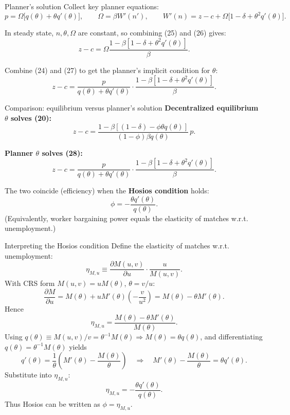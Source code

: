 \documentclass[aspectratio=169,xcolor=dvipsnames]{beamer}
\begin{document}
\begin{frame}{Planner's solution}
\label{slide:MP_47_PlannerSol}
\small
Collect key planner equations:
\[
p=\Omega\big[q(\theta)+\theta q'(\theta)\big],
\qquad
\Omega=\beta W'(n'),
\qquad
W'(n)=z-c+\Omega\big[1-\delta+\theta^2 q'(\theta)\big].
\]

In steady state, \(n,\theta,\Omega\) are constant, so combining (25) and (26) gives:
\[
z-c
=
\Omega\frac{1-\beta[1-\delta+\theta^2 q'(\theta)]}{\beta}.
\tag{27}
\]

Combine (24) and (27) to get the planner's implicit condition for \(\theta\):
\[
z-c
=
\frac{p}{q(\theta)+\theta q'(\theta)}\cdot
\frac{1-\beta[1-\delta+\theta^2 q'(\theta)]}{\beta}.
\tag{28}
\]
\end{frame}

\begin{frame}{Comparison: equilibrium versus planner's solution}
\label{slide:MP_48_Compare}
\small
\textbf{Decentralized equilibrium \(\theta\) solves (20):}
\[
z-c
=
\frac{1-\beta[(1-\delta)-\phi\theta q(\theta)]}{(1-\phi)\beta q(\theta)}\,p.
\tag{20}
\]

\textbf{Planner \(\theta\) solves (28):}
\[
z-c
=
\frac{p}{q(\theta)+\theta q'(\theta)}\cdot
\frac{1-\beta[1-\delta+\theta^2 q'(\theta)]}{\beta}.
\tag{28}
\]

The two coincide (efficiency) when the \textbf{Hosios condition} holds:
\[
\phi = -\frac{\theta q'(\theta)}{q(\theta)}.
\]
(Equivalently, worker bargaining power equals the elasticity of matches w.r.t. unemployment.)
\end{frame}

\begin{frame}{Interpreting the Hosios condition}
\label{slide:MP_49_HosiosDerive}
\footnotesize
Define the elasticity of matches w.r.t. unemployment:
\[
\eta_{M,u}\equiv \frac{\partial M(u,v)}{\partial u}\cdot \frac{u}{M(u,v)}.
\]
With CRS form \(M(u,v)=uM(\theta)\), \(\theta=v/u\):
\[
\frac{\partial M}{\partial u}
=
M(\theta) + uM'(\theta)\left(-\frac{v}{u^2}\right)
=
M(\theta)-\theta M'(\theta).
\]
Hence
\[
\eta_{M,u}=\frac{M(\theta)-\theta M'(\theta)}{M(\theta)}.
\]
Using \(q(\theta)\equiv M(u,v)/v=\theta^{-1}M(\theta)\Rightarrow M(\theta)=\theta q(\theta)\),
and differentiating \(q(\theta)=\theta^{-1}M(\theta)\) yields
\[
q'(\theta)=\frac{1}{\theta}\left(M'(\theta)-\frac{M(\theta)}{\theta}\right)
\quad\Rightarrow\quad
M'(\theta)-\frac{M(\theta)}{\theta}=\theta q'(\theta).
\]
Substitute into \(\eta_{M,u}\):
\[
\eta_{M,u}=-\frac{\theta q'(\theta)}{q(\theta)}.
\]
Thus Hosios can be written as \(\phi=\eta_{M,u}\).
\end{frame}
\end{document}

